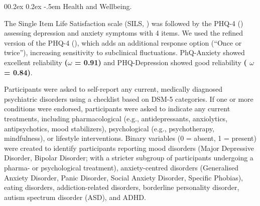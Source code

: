 \documentclass[
  man,
  floatsintext,
  longtable,
  nolmodern,
  notxfonts,
  notimes,
  mask,
  colorlinks=true,linkcolor=blue,citecolor=blue,urlcolor=blue]{apa7}
\makeatletter
\renewcommand{\paragraph}{\@startsection{paragraph}{4}{\parindent}%
	{0\baselineskip \@plus 0.2ex \@minus 0.2ex}%
	{-.5em}%
	{\normalfont\normalsize\bfseries\typesectitle}}
\makeatother
\begin{document}
\paragraph{Health and Wellbeing.}\label{health-and-wellbeing}

The Single Item Life Satisfaction scale (SILS,
) was
followed by the PHQ-4 () assessing depression and anxiety symptoms with 4 items. We used
the refined version of the PHQ-4
(), which
adds an additional response option (``Once or twice''), increasing
sensitivity to subclinical fluctuations. PhQ-Anxiety showed excellent
reliability \textbf{(\(\omega\) = 0.91)} and PHQ-Depression showed good
reliability \textbf{( \(\omega\) = 0.84)}.

Participants were asked to self-report any current, medically diagnosed
psychiatric disorders using a checklist based on DSM-5 categories. If
one or more conditions were endorsed, participants were asked to
indicate any current treatments, including pharmacological (e.g.,
antidepressants, anxiolytics, antipsychotics, mood stabilizers),
psychological (e.g., psychotherapy, mindfulness), or lifestyle
interventions. Binary variables (0 = absent, 1 = present) were created
to identify participants reporting mood disorders (Major Depressive
Disorder, Bipolar Disorder; with a stricter subgroup of participants
undergoing a pharma- or psychological treatment), anxiety-centred
disorders (Generalised Anxiety Disorder, Panic Disorder, Social Anxiety
Disorder, Specific Phobias), eating disorders, addiction-related
disorders, borderline personality disorder, autism spectrum disorder
(ASD), and ADHD.
\end{document}
